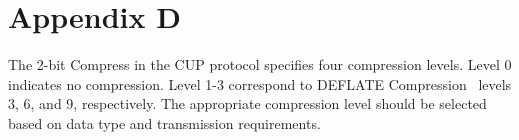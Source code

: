 \documentclass[preprint,12pt]{elsarticle}
\begin{document}
\section*{Appendix D}

The 2-bit Compress in the CUP protocol specifies four compression levels. Level 0 indicates no compression. Level 1-3 correspond to DEFLATE Compression~\cite{oswal2016deflate} levels 3, 6, and 9, respectively. The appropriate compression level should be selected based on data type and transmission requirements.







\end{document}
